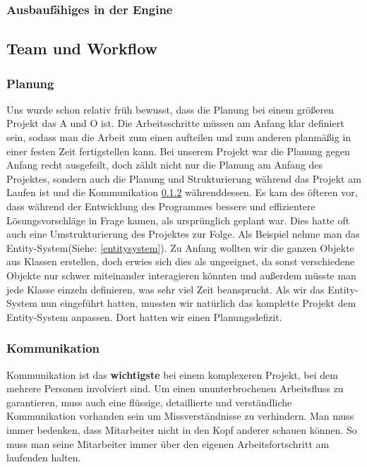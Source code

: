\subsubsection{Ausbaufähiges in der Engine}

\subsection{Team und Workflow}
\subsubsection{Planung}
Uns wurde schon relativ früh bewusst, dass die Planung bei einem größeren Projekt das A und O ist. Die Arbeitsschritte müssen am Anfang klar definiert sein, sodass man die Arbeit zum einen aufteilen und zum anderen planmäßig in einer festen Zeit fertigstellen kann. Bei unserem Projekt war die Planung gegen Anfang recht ausgefeilt, doch zählt nicht nur die Planung am Anfang des Projektes, sondern auch die Planung und Strukturierung während das Projekt am Laufen ist und die Kommunikation \ref{kommunikation} währenddessen. Es kam des öfteren vor, dass während der Entwicklung des Programmes bessere und effizientere Lösungsvorschläge in Frage kamen, als ursprünglich geplant war. Dies hatte oft auch eine Umstrukturierung des Projektes zur Folge. Als Beispiel nehme man das Entity-System(Siehe: \ref{entitysystem}). Zu Anfang wollten wir die ganzen Objekte aus Klassen erstellen, doch erwies sich dies als ungeeignet, da sonst verschiedene Objekte nur schwer miteinander interagieren könnten und außerdem müsste man jede Klasse einzeln definieren, was sehr viel Zeit beansprucht. 
Als wir das Entity-System nun eingeführt hatten, mussten wir natürlich das komplette Projekt dem Entity-System anpassen. Dort hatten wir einen Planungsdefizit.
                                                                                      
\subsubsection{Kommunikation}
\label{kommunikation}
Kommunikation ist das \textbf{wichtigste} bei einem komplexeren Projekt, bei dem mehrere Personen involviert sind. Um einen ununterbrochenen Arbeitsfluss zu garantieren, muss auch eine flüssige, detaillierte und verständliche Kommunikation vorhanden sein um Missverständnisse zu verhindern. Man muss immer bedenken, dass Mitarbeiter nicht in den Kopf anderer schauen können. So muss man seine Mitarbeiter immer über den eigenen Arbeitsfortschritt am laufenden halten.

